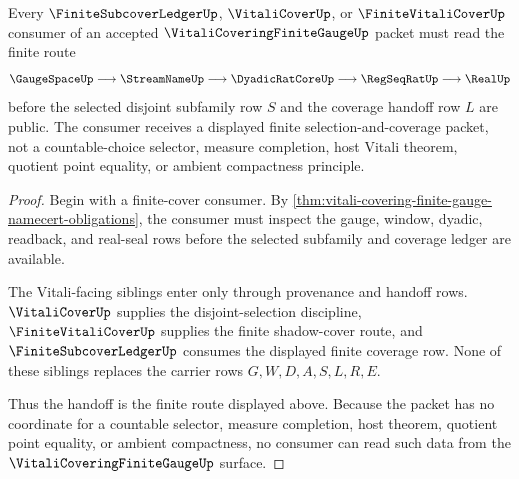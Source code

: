 \begin{theorem}
\label{thm:vitali-covering-finite-gauge-disjoint-selection-handoff}
Every $\FiniteSubcoverLedgerUp$, $\VitaliCoverUp$, or $\FiniteVitaliCoverUp$ consumer of an accepted $\VitaliCoveringFiniteGaugeUp$ packet must read the finite route
$$
\GaugeSpaceUp \longrightarrow \StreamNameUp \longrightarrow \DyadicRatCoreUp \longrightarrow \RegSeqRatUp \longrightarrow \RealUp
$$
before the selected disjoint subfamily row $S$ and the coverage handoff row $L$ are public. The consumer receives a displayed finite selection-and-coverage packet, not a countable-choice selector, measure completion, host Vitali theorem, quotient point equality, or ambient compactness principle.
\end{theorem}
\begin{proof}
Begin with a finite-cover consumer. By \autoref{thm:vitali-covering-finite-gauge-namecert-obligations}, the consumer must inspect the gauge, window, dyadic, readback, and real-seal rows before the selected subfamily and coverage ledger are available.

The Vitali-facing siblings enter only through provenance and handoff rows. $\VitaliCoverUp$ supplies the disjoint-selection discipline, $\FiniteVitaliCoverUp$ supplies the finite shadow-cover route, and $\FiniteSubcoverLedgerUp$ consumes the displayed finite coverage row. None of these siblings replaces the carrier rows $G,W,D,A,S,L,R,E$.

Thus the handoff is the finite route displayed above. Because the packet has no coordinate for a countable selector, measure completion, host theorem, quotient point equality, or ambient compactness, no consumer can read such data from the $\VitaliCoveringFiniteGaugeUp$ surface.
\end{proof}



